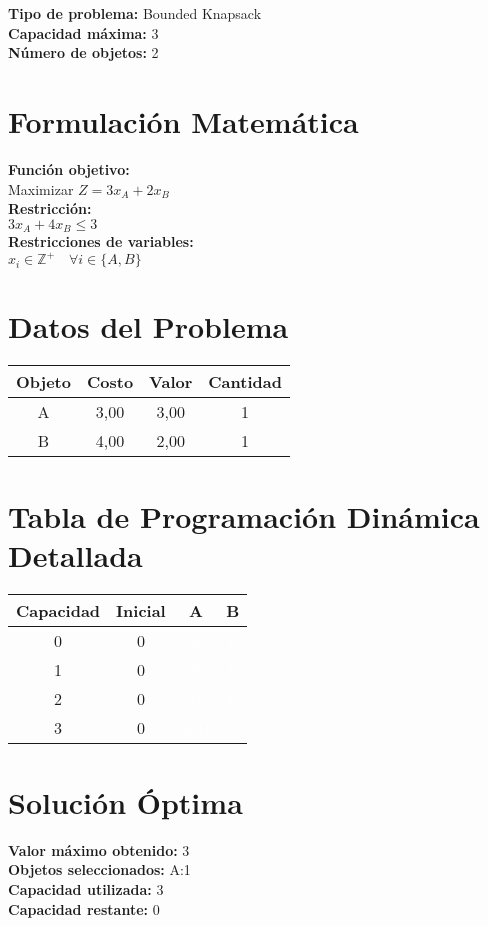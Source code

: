 \documentclass{article}
\begin{document}
\thispagestyle{empty}
\newpage
\textbf{Tipo de problema:} Bounded Knapsack\\
\textbf{Capacidad máxima:} 3\\
\textbf{Número de objetos:} 2\\

\section*{Formulación Matemática}
\textbf{Función objetivo:}\\
Maximizar $Z = 3 x_{A} + 2 x_{B}$\\

\textbf{Restricción:}\\
$3 x_{A} + 4 x_{B} \leq 3$\\

\textbf{Restricciones de variables:}\\
$x_i \in \mathbb{Z}^+ \quad \forall i \in \{A, B\}$\\
\vspace{0.5cm}

\section*{Datos del Problema}
\begin{tabular}{|c|c|c|c|}
\hline
Objeto & Costo & Valor & Cantidad \\
\hline
A & 3,00 & 3,00 & 1 \\
B & 4,00 & 2,00 & 1 \\
\hline
\end{tabular}

\section*{Tabla de Programación Dinámica Detallada}
\begin{center}
\scriptsize
\begin{tabular}{|c|c|c|c|}
\hline
Capacidad & Inicial & A & B \\ \hline
0 & 0 & \cellcolor{rojo}\textcolor{white}{0} & \cellcolor{rojo}\textcolor{white}{0} \\ \hline
1 & 0 & \cellcolor{rojo}\textcolor{white}{0} & \cellcolor{rojo}\textcolor{white}{0} \\ \hline
2 & 0 & \cellcolor{rojo}\textcolor{white}{0} & \cellcolor{rojo}\textcolor{white}{0} \\ \hline
3 & 0 & \cellcolor{verde}\textcolor{white}{3(1)} & \cellcolor{rojo}\textcolor{white}{3} \\ \hline
\end{tabular}
\end{center}
\normalsize

\section*{Solución Óptima}
\textbf{Valor máximo obtenido:} 3\\
\textbf{Objetos seleccionados:} A:1\\
\textbf{Capacidad utilizada:} 3\\
\textbf{Capacidad restante:} 0\\
\end{document}
